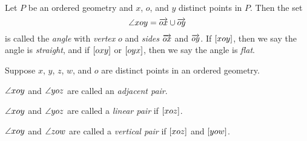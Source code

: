 \begin{dfn}[Angle]
Let \(P\) be an ordered geometry and \(x\), \(o\), and \(y\) distinct points in \(P\).
Then the set \[ \angle{xoy} = \overrightarrow{ox} \cup \overrightarrow{oy} \] is called the \emph{angle} with \emph{vertex} \(o\) and \emph{sides} \(\overrightarrow{ox}\) and \(\overrightarrow{oy}\).
If \([ x o y ]\), then we say the angle is \emph{straight}, and if \([ o x y ]\) or \([ o y x ]\), then we say the angle is \emph{flat}.
\end{dfn}

\begin{dfn}
Suppose \(x\), \(y\), \(z\), \(w\), and \(o\) are distinct points in an ordered geometry.
\begin{proplist}
\item \(\angle{xoy}\) and \(\angle{yoz}\) are called an \emph{adjacent pair}.
\item \(\angle{xoy}\) and \(\angle{yoz}\) are called a \emph{linear pair} if \([ x o z ]\).
\item \(\angle{xoy}\) and \(\angle{zow}\) are called a \emph{vertical pair} if \([ x o z ]\) and \([ y o w ]\).
\end{proplist}
\end{dfn}

